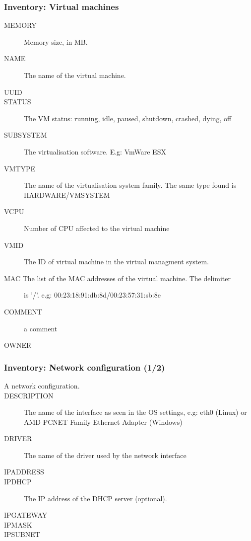 \documentclass{beamer}
\begin{document}
\begin{frame}
\frametitle{Inventory: Virtual machines}
\begin{description}
      \item[MEMORY] Memory size, in MB.
      \item[NAME] The name of the virtual machine.
      \item[UUID]
      \item[STATUS] The VM status: running, idle, paused, shutdown, crashed, dying, off
      \item[SUBSYSTEM] The virtualisation software. E.g: VmWare ESX
      \item[VMTYPE] The name of the virtualisation system family. The same type found is HARDWARE/VMSYSTEM
      \item[VCPU] Number of CPU affected to the virtual machine
      \item[VMID] The ID of virtual machine in the virtual managment system.
      \item[MAC The list of the MAC addresses of the virtual machine. The delimiter] is '/'. e.g: 00:23:18:91:db:8d/00:23:57:31:sb:8e
      \item[COMMENT] a comment
      \item[OWNER]
\end{description}
\end{frame}
\begin{frame}
\frametitle{Inventory: Network configuration (1/2)}
\begin{description}
      \item[A network configuration.]
      \item[DESCRIPTION] The name of the interface as seen in the OS settings, e.g: eth0 (Linux) or AMD PCNET Family Ethernet Adapter (Windows)
      \item[DRIVER] The name of the driver used by the network interface
      \item[IPADDRESS]
      \item[IPDHCP] The IP address of the DHCP server (optional).
      \item[IPGATEWAY]
      \item[IPMASK]
      \item[IPSUBNET]
\end{description}
\end{frame}
\end{document}
